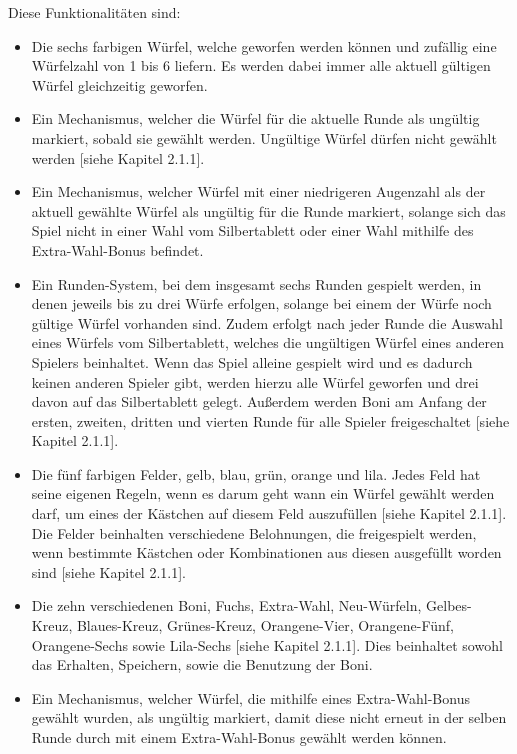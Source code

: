Diese Funktionalitäten sind:
\begin{itemize}
\item Die sechs farbigen Würfel, welche geworfen werden können und zufällig eine Würfelzahl von 1 bis 6 liefern. Es werden dabei immer alle aktuell gültigen Würfel gleichzeitig geworfen.

\item Ein Mechanismus, welcher die Würfel für die aktuelle Runde als ungültig markiert, sobald sie gewählt werden. Ungültige Würfel dürfen nicht gewählt werden [siehe Kapitel 2.1.1].

\item Ein Mechanismus, welcher Würfel mit einer niedrigeren Augenzahl als der aktuell gewählte Würfel als ungültig für die Runde markiert, solange sich das Spiel nicht in einer Wahl vom Silbertablett oder einer Wahl mithilfe des Extra-Wahl-Bonus befindet.

\item Ein Runden-System, bei dem insgesamt sechs Runden gespielt werden, in denen jeweils bis zu drei Würfe erfolgen, solange bei einem der Würfe noch gültige Würfel vorhanden sind. Zudem erfolgt nach jeder Runde die Auswahl eines Würfels vom Silbertablett, welches die ungültigen Würfel eines anderen Spielers beinhaltet. Wenn das Spiel alleine gespielt wird und es dadurch keinen anderen Spieler gibt, werden hierzu alle Würfel geworfen und drei davon auf das Silbertablett gelegt. Außerdem werden Boni am Anfang der ersten, zweiten, dritten und vierten Runde für alle Spieler freigeschaltet [siehe Kapitel 2.1.1].

\item Die fünf farbigen Felder, gelb, blau, grün, orange und lila. Jedes Feld hat seine eigenen Regeln, wenn es darum geht wann ein Würfel gewählt werden darf, um eines der Kästchen auf diesem Feld auszufüllen [siehe Kapitel 2.1.1]. Die Felder beinhalten verschiedene Belohnungen, die freigespielt werden, wenn bestimmte Kästchen oder Kombinationen aus diesen ausgefüllt worden sind [siehe Kapitel 2.1.1].

\item Die zehn verschiedenen Boni, Fuchs, Extra-Wahl, Neu-Würfeln, Gelbes-Kreuz, Blaues-Kreuz, Grünes-Kreuz, Orangene-Vier, Orangene-Fünf, Orangene-Sechs sowie Lila-Sechs [siehe Kapitel 2.1.1]. Dies beinhaltet sowohl das Erhalten, Speichern, sowie die Benutzung der Boni.

\item Ein Mechanismus, welcher Würfel, die mithilfe eines Extra-Wahl-Bonus gewählt wurden, als ungültig markiert, damit diese nicht erneut in der selben Runde durch mit einem Extra-Wahl-Bonus gewählt werden können.


\end{itemize}
